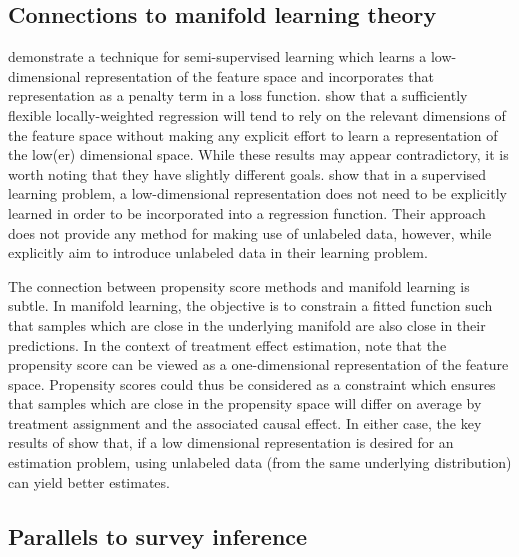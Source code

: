 \documentclass[aos]{imsart}
\begin{document}
\subsection{Connections to manifold learning theory}

\cite{belkin2006manifold} demonstrate a technique for semi-supervised learning which learns a low-dimensional representation of the feature space and incorporates that representation 
as a penalty term in a loss function. \cite{bickel2007local} show that a sufficiently flexible locally-weighted regression will tend to rely on the relevant dimensions of the feature space 
without making any explicit effort to learn a representation of the low(er) dimensional space. While these results may appear contradictory, it is worth noting that they have slightly different goals. 
\cite{bickel2007local} show that in a supervised learning problem, a low-dimensional representation does not need to be explicitly learned in order to be incorporated into a regression function. 
Their approach does not provide any method for making use of unlabeled data, however, while \cite{belkin2006manifold} explicitly aim to introduce unlabeled data in their learning problem.

The connection between propensity score methods and manifold learning is subtle. In manifold learning, the objective is to constrain a fitted function such that samples which are close 
in the underlying manifold are also close in their predictions. In the context of treatment effect estimation, \cite{hahn2020bayesian} note that the propensity score can be viewed 
as a one-dimensional representation of the feature space. Propensity scores could thus be considered as a constraint which ensures that samples which are close in the propensity space 
will differ on average by treatment assignment and the associated causal effect. In either case, the key results of \cite{belkin2006manifold} show that, if a low dimensional representation is 
desired for an estimation problem, using unlabeled data (from the same underlying distribution) can yield better estimates.

\subsection{Parallels to survey inference}
\end{document}
